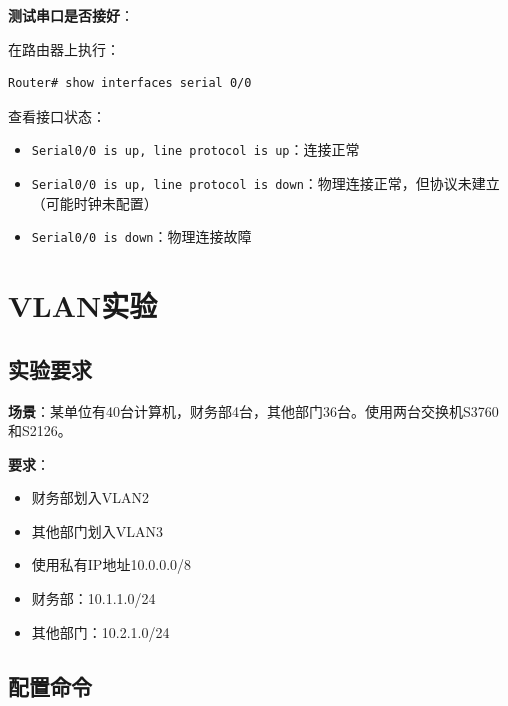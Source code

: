 \documentclass[12pt,a4paper]{ctexart}
\begin{document}
\begin{keybox}
\textbf{测试串口是否接好}：

在路由器上执行：
\begin{lstlisting}
Router# show interfaces serial 0/0
\end{lstlisting}

查看接口状态：
\begin{itemize}[itemsep=0pt]
    \item \texttt{Serial0/0 is up, line protocol is up}：连接正常
    \item \texttt{Serial0/0 is up, line protocol is down}：物理连接正常，但协议未建立（可能时钟未配置）
    \item \texttt{Serial0/0 is down}：物理连接故障
\end{itemize}
\end{keybox}

\section{VLAN实验}

\subsection{实验要求}

\begin{exambox}[VLAN实验典型题]
\textbf{场景}：某单位有40台计算机，财务部4台，其他部门36台。使用两台交换机S3760和S2126。

\textbf{要求}：
\begin{itemize}[itemsep=0pt]
    \item 财务部划入VLAN2
    \item 其他部门划入VLAN3
    \item 使用私有IP地址10.0.0.0/8
    \item 财务部：10.1.1.0/24
    \item 其他部门：10.2.1.0/24
\end{itemize}
\end{exambox}

\subsection{配置命令}
\end{document}
